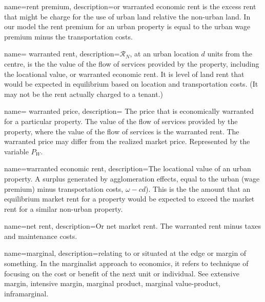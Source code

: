 {
name=rent premium,
description={or \gls{warranted economic rent} is the excess rent  that might be charge for the use of urban land relative the non-urban land. In our model the rent premium for an urban property is equal to the urban wage premium minus the transportation costs. }
}

{
name= warranted rent,
description={$\mathcal{R}_N$, at an  urban location  $d$ units from the centre, is the the value of the flow of services provided by the property, including the locational value, or \gls{warranted economic rent}. It is level of land rent that would be expected in equilibrium based on location and transportation costs.  (It may not be the rent actually charged to a tenant.) }
}

{
name= warranted price,
description={%
The price that is economically warranted for a particular property. The  value of the flow of services provided by the property, where the value of the flow of services is the \gls{warranted rent}. %
The warranted price may differ from the realized \gls{market price}. Represented by the variable $P_W$. }
}

{
name=warranted economic rent,
description={The locational value of an urban property. A surplus generated by \glspl{agglomeration effect}, equal to the urban (wage premium) minus transportation costs, $\omega-{c} d$). This is the the amount that an equilibrium market rent for a property would be expected to exceed the market rent for a similar non-urban property.}
}

{
name=net rent,
description={Or net market rent. The \gls{warranted rent} minus taxes and maintenance costs.}
}



{
name=marginal,
description={relating to or situated at the edge or margin of something. In the marginalist approach to economics, it  refers to technique of focusing on the cost or benefit of the next unit or individual. See \gls{extensive margin}, \gls{intensive margin}, \gls{marginal product}, \gls{marginal value-product}, \gls{inframarginal}.}
}

